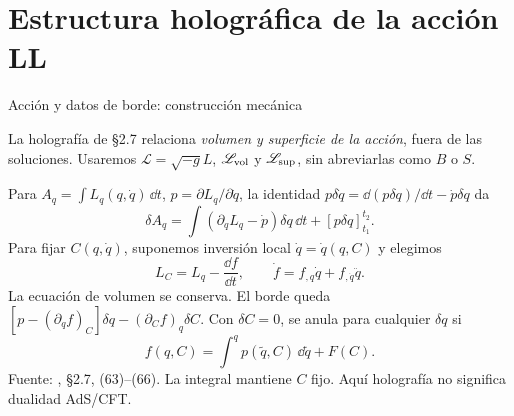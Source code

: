 \section{Estructura holográfica de la acción LL}
\setcounter{holografiaSavedEquation}{\value{equation}}
\begingroup
\setcounter{equation}{0}
\renewcommand{\theequation}{H\arabic{equation}}
\renewcommand{\theHequation}{holografia.\arabic{equation}}
\begin{frame}[label=holo-ll-01]{Acción y datos de borde: construcción mecánica}

\footnotesize\CompactDisplaySpacing
La holografía de §2.7 relaciona \emph{volumen y superficie de la acción}, fuera de las soluciones. Usaremos $\mathscr L=\sqrt{-g}L$, $\mathscr L_{\rm vol}$ y $\mathscr L_{\rm sup}$, sin abreviarlas como $B$ o $S$.

Para $A_q=\int L_q(q,\dot q)\,\dd t$, $p=\partial L_q/\partial\dot q$,
la identidad $p\delta\dot q=\dd(p\delta q)/\dd t-\dot p\delta q$ da
\begin{equation}
\delta A_q=\int(\partial_qL_q-\dot p)\delta q\,\dd t+[p\delta q]_{t_1}^{t_2}.
\label{eq:holo-mechanical-variation}
\end{equation}
Para fijar $C(q,\dot q)$, suponemos inversión local $\dot q=\dot q(q,C)$ y elegimos
\begin{equation}
L_C=L_q-\frac{\dd f}{\dd t},\qquad \dot f=f_{,q}\dot q+f_{,\dot q}\ddot q.
\label{eq:holo-LC}
\end{equation}
La ecuación de volumen se conserva. El borde queda
$[p-(\partial_qf)_C]\delta q-(\partial_C f)_q\delta C$.
Con $\delta C=0$, se anula para cualquier $\delta q$ si
\begin{equation}
f(q,C)=\int^q p(\tilde q,C)\,\dd\tilde q+F(C).
\label{eq:holo-fC}
\end{equation}
{\scriptsize Fuente: \cite{PadmanabhanKothawala2013}, §2.7, (63)--(66). La integral mantiene $C$ fijo. Aquí holografía no significa dualidad AdS/CFT.}
\end{frame}
